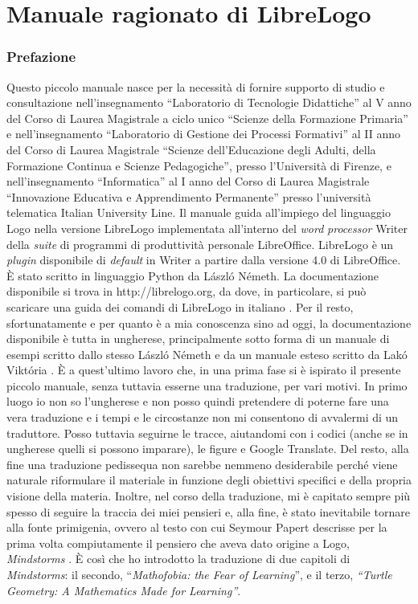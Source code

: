 \part{Manuale ragionato di LibreLogo}

\section{Prefazione}
Questo piccolo manuale nasce per la necessità di fornire supporto di studio e
consultazione nell'insegnamento “Laboratorio di Tecnologie Didattiche” al V
anno del Corso di Laurea Magistrale a ciclo unico “Scienze della Formazione
Primaria” e nell'insegnamento “Laboratorio di Gestione dei Processi Formativi”
al II anno del Corso di Laurea Magistrale “Scienze dell'Educazione degli
Adulti, della Formazione Continua e Scienze Pedagogiche”, presso l'Università
di Firenze, e nell'insegnamento “Informatica” al I anno del Corso di Laurea
Magistrale “Innovazione Educativa e Apprendimento Permanente” presso
l'università telematica Italian University Line. Il manuale guida all'impiego
del linguaggio Logo nella versione LibreLogo implementata all'interno del \textit{word}
\textit{processor} Writer della \textit{suite} di programmi di produttività personale
LibreOffice. LibreLogo è un \textit{plugin} disponibile di \textit{default} in Writer a partire
dalla versione 4.0 di LibreOffice. È stato scritto in linguaggio Python da
László Németh. La documentazione disponibile si trova in http://librelogo.org,
da dove, in particolare, si può scaricare una guida dei comandi di LibreLogo in
italiano \cite{LibreLogo}. Per il resto, sfortunatamente e per quanto è a mia conoscenza sino ad oggi, la documentazione disponibile è tutta in ungherese, principalmente sotto forma di un manuale di esempi scritto dallo stesso László Németh \cite{LibreLogo2} e da un manuale esteso scritto da Lakó Viktória \cite{LibreLogo3}. È a quest'ultimo lavoro che, in una prima fase si è ispirato il presente piccolo manuale, senza tuttavia esserne una traduzione, per vari motivi. In primo luogo io non so l'ungherese e non posso quindi pretendere di poterne fare una vera traduzione e i tempi e le circostanze non mi consentono di avvalermi di un traduttore. Posso tuttavia seguirne le tracce, aiutandomi con i codici (anche se in ungherese quelli si possono imparare), le figure e Google Translate. Del resto, alla fine una traduzione pedissequa non sarebbe nemmeno desiderabile perché viene naturale riformulare il materiale in funzione degli obiettivi specifici e della propria visione della materia. Inoltre, nel corso della traduzione, mi è capitato sempre più spesso di seguire la traccia dei miei pensieri e, alla fine, è stato inevitabile tornare alla fonte primigenia, ovvero al testo con cui Seymour Papert descrisse per la prima volta compiutamente il pensiero che aveva dato origine a Logo, \textit{Mindstorms} \cite{Papert}. È così che ho introdotto la traduzione di due capitoli di \textit{Mindstorms}: il secondo, “\textit{Mathofobia: the Fear of Learning}”, e il terzo, \textit{“Turtle Geometry: A Mathematics Made for Learning”}.

